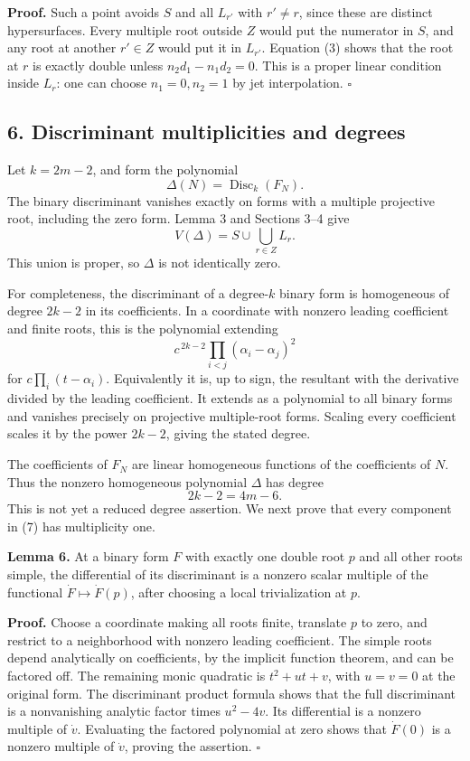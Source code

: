 \documentclass[
  11pt,
]{article}
\begin{document}
\textbf{Proof.} Such a point avoids \(S\) and all \(L_{r'}\) with
\(r'\ne r\), since these are distinct hypersurfaces. Every multiple root
outside \(Z\) would put the numerator in \(S\), and any root at another
\(r'\in Z\) would put it in \(L_{r'}\). Equation (3) shows that the root
at \(r\) is exactly double unless \(n_2d_1-n_1d_2=0\). This is a proper
linear condition inside \(L_r\): one can choose \(n_1=0,n_2=1\) by jet
interpolation. \(\square\)

\subsection{6. Discriminant multiplicities and
degrees}\label{discriminant-multiplicities-and-degrees}

Let \(k=2m-2\), and form the polynomial \[
 \Delta(N)=\operatorname{Disc}_{k}(F_N).
\] The binary discriminant vanishes exactly on forms with a multiple
projective root, including the zero form. Lemma 3 and Sections 3--4 give
\[
 V(\Delta)=S\cup\bigcup_{r\in Z}L_r.
 \tag{7}
\] This union is proper, so \(\Delta\) is not identically zero.

For completeness, the discriminant of a degree-\(k\) binary form is
homogeneous of degree \(2k-2\) in its coefficients. In a coordinate with
nonzero leading coefficient and finite roots, this is the polynomial
extending \[
 c^{\,2k-2}\prod_{i<j}(\alpha_i-\alpha_j)^2
\] for \(c\prod_i(t-\alpha_i)\). Equivalently it is, up to sign, the
resultant with the derivative divided by the leading coefficient. It
extends as a polynomial to all binary forms and vanishes precisely on
projective multiple-root forms. Scaling every coefficient scales it by
the power \(2k-2\), giving the stated degree.

The coefficients of \(F_N\) are linear homogeneous functions of the
coefficients of \(N\). Thus the nonzero homogeneous polynomial
\(\Delta\) has degree \[
 2k-2=4m-6.
 \tag{8}
\] This is not yet a reduced degree assertion. We next prove that every
component in (7) has multiplicity one.

\textbf{Lemma 6.} At a binary form \(F\) with exactly one double root
\(p\) and all other roots simple, the differential of its discriminant
is a nonzero scalar multiple of the functional
\(\dot F\mapsto\dot F(p)\), after choosing a local trivialization at
\(p\).

\textbf{Proof.} Choose a coordinate making all roots finite, translate
\(p\) to zero, and restrict to a neighborhood with nonzero leading
coefficient. The simple roots depend analytically on coefficients, by
the implicit function theorem, and can be factored off. The remaining
monic quadratic is \(t^2+ut+v\), with \(u=v=0\) at the original form.
The discriminant product formula shows that the full discriminant is a
nonvanishing analytic factor times \(u^2-4v\). Its differential is a
nonzero multiple of \(\dot v\). Evaluating the factored polynomial at
zero shows that \(\dot F(0)\) is a nonzero multiple of \(\dot v\),
proving the assertion. \(\square\)
\end{document}
